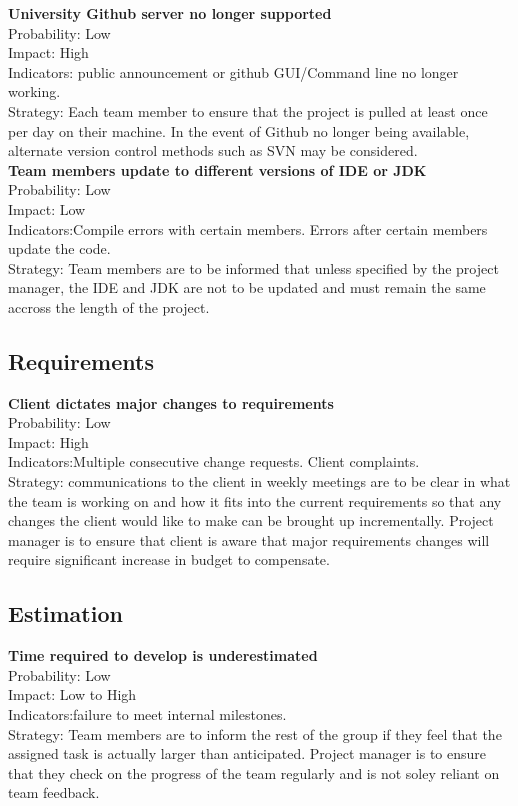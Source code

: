 \documentclass[11pt, a4paper]{article}
\begin{document}
			\textbf{University Github server no longer supported}\\
			Probability: Low\\
			Impact: High\\
			Indicators: public announcement or github GUI/Command line no longer working. \\
			Strategy: Each team member to ensure that the project is pulled at least once per day on their machine. In the event of Github no longer being available, alternate version control methods such as SVN may be considered.\\

			\textbf{Team members update to different versions of IDE or JDK}\\
			Probability: Low\\
			Impact: Low\\
			Indicators:Compile errors with certain members. Errors after certain members update the code.\\
			Strategy: Team members are to be informed that unless specified by the project manager, the IDE and JDK are not to be updated and must remain the same accross the length of the project. \\

			\subsection*{Requirements}
			\textbf{Client dictates major changes to requirements}\\
			Probability: Low\\
			Impact: High\\
			Indicators:Multiple consecutive change requests. Client complaints. \\
			Strategy: communications to the client in weekly meetings are to be clear in what the team is working on and how it fits into the current requirements so that any changes the client would like to make can be brought up incrementally. Project manager is to ensure that client is aware that major requirements changes will require significant increase in budget to compensate.\\

			\subsection*{Estimation}
			\textbf{Time required to develop is underestimated}\\
			Probability: Low\\
			Impact: Low to High\\
			Indicators:failure to meet internal milestones.\\
			Strategy: Team members are to inform the rest of the group if they feel that the assigned task is actually larger than anticipated. Project manager is to ensure that they check on the progress of the team regularly and is not soley reliant on team feedback.
\end{document}
